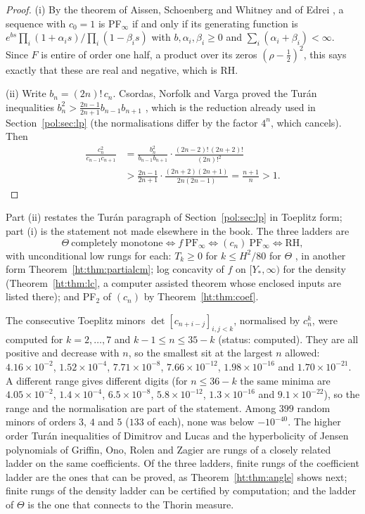\begin{proof}
(i) By the theorem of Aissen, Schoenberg and Whitney and of Edrei \cite{ASW52,Edrei53}, a sequence with $c_0=1$ is PF$_\infty$ if and only if its generating function is $e^{bs}\prod_i(1+\alpha_is)/\prod_i(1-\beta_is)$ with $b,\alpha_i,\beta_i\ge0$ and $\sum_i(\alpha_i+\beta_i)<\infty$. %
Since $F$ is entire of order one half, a product over its zeros $(\rho-\frac12)^2$, this says exactly that these are real and negative, which is RH.

(ii) Write $b_n=(2n)!\,c_n$. Csordas, Norfolk and Varga proved the Tur\'an inequalities $b_n^2>\frac{2n-1}{2n+1}b_{n-1}b_{n+1}$ \cite{CNV86}, which is the reduction already used in Section~\ref{pol:sec:lp} (the normalisations differ by the factor $4^n$, which cancels). Then
\[
\begin{split}\frac{c_n^2}{c_{n-1}c_{n+1}}&=\frac{b_n^2}{b_{n-1}b_{n+1}}\cdot\frac{(2n-2)!\,(2n+2)!}{(2n)!^2}\\&>\frac{2n-1}{2n+1}\cdot\frac{(2n+2)(2n+1)}{2n(2n-1)}=\frac{n+1}n>1 .\end{split}
\]
\end{proof}

Part (ii) restates the Tur\'an paragraph of Section~\ref{pol:sec:lp} in Toeplitz form; part (i) is the statement not made elsewhere in the book. The three ladders are
\[
\Theta\ \text{completely monotone}\iff f\ \text{PF}_\infty\iff(c_n)\ \text{PF}_\infty\iff\text{RH},
\]
with unconditional low rungs for each: $T_k\ge0$ for $k\le H^2/80$ for $\Theta$ \cite[Section 6]{P17}, in another form Theorem~\ref{ht:thm:partialcm}; log concavity of $f$ on $[Y_{\!*},\infty)$ for the density (Theorem~\ref{ht:thm:lc}, a computer assisted theorem whose enclosed inputs are listed there); and PF$_2$ of $(c_n)$ by Theorem~\ref{ht:thm:coef}.

The consecutive Toeplitz minors $\det[c_{n+i-j}]_{i,j<k}$, normalised by $c_n^k$, were computed for $k=2,\dots,7$ and $k-1\le n\le35-k$ (status: computed). They are all positive and decrease with $n$, so the smallest sit at the largest $n$ allowed: $4.16\times10^{-2}$, $1.52\times10^{-4}$, $7.71\times10^{-8}$, $7.66\times10^{-12}$, $1.98\times10^{-16}$ and $1.70\times10^{-21}$. A different range gives different digits (for $n\le36-k$ the same minima are $4.05\times10^{-2}$, $1.4\times10^{-4}$, $6.5\times10^{-8}$, $5.8\times10^{-12}$, $1.3\times10^{-16}$ and $9.1\times10^{-22}$), so the range and the normalisation are part of the statement. Among $399$ random minors of orders $3$, $4$ and $5$ ($133$ of each), none was below $-10^{-40}$. The higher order Tur\'an inequalities of Dimitrov and Lucas \cite{DL11} and the hyperbolicity of Jensen polynomials of Griffin, Ono, Rolen and Zagier \cite{GORZ19} are rungs of a closely related ladder on the same coefficients. %
Of the three ladders, finite rungs of the coefficient ladder are the ones that can be proved, as Theorem~\ref{ht:thm:angle} shows next; finite rungs of the density ladder can be certified by computation; and the ladder of $\Theta$ is the one that connects to the Thorin measure.

